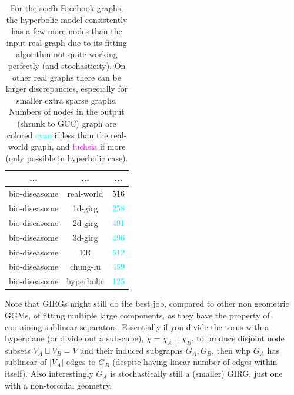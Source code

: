 \begin{table}[]
\begin{tabular}{|c|c|c|}
    ... & ... & ... \\ \hline
    \textcolor{ao(english)}{bio-diseasome} & \textcolor{ao(english)}{real-world} & \textcolor{ao(english)}{516} \\ \hline
    bio-diseasome & 1d-girg & \textcolor{cyan}{258} \\ \hline
    bio-diseasome & 2d-girg & \textcolor{cyan}{491} \\ \hline
    bio-diseasome & 3d-girg & \textcolor{cyan}{496} \\ \hline
    bio-diseasome & ER & \textcolor{cyan}{512} \\ \hline
    bio-diseasome & chung-lu & \textcolor{cyan}{459} \\ \hline
    bio-diseasome & hyperbolic & \textcolor{cyan}{125} \\ \hline
    \end{tabular}
    \caption{
    For the socfb Facebook graphs, the hyperbolic model consistently has a few more nodes than the input real graph due to its fitting algorithm not quite working perfectly (and stochasticity).
    On other real graphs there can be larger discrepancies, especially for smaller extra sparse graphs.
    Numbers of nodes in the output (shrunk to GCC) graph are colored \textcolor{cyan}{cyan} if less than the real-world graph, and \textcolor{fuchsia}{fuchsia} if more (only possible in hyperbolic case).
    }
    \label{tab:blasius_HRG_n_fitting_renunciation}
\end{table}
    



Note that GIRGs might still do the best job, compared to other non geometric GGMs, of fitting multiple large components, as they have the property of containing sublinear separators. Essentially if you divide the torus with a hyperplane (or divide out a sub-cube), $\chi = \chi_A \sqcup \chi_B$, to produce disjoint node subsets $V_A \sqcup V_B = V$ and their induced subgraphs $G_A, G_B$, then whp $G_A$ has sublinear of $|V_A|$ edges to $G_B$ (despite having linear number of edges within itself). Also interestingly $G_A$ is stochastically still a (smaller) GIRG, just one with a non-toroidal geometry.





